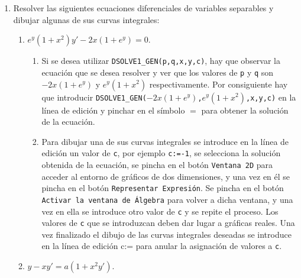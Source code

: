 \begin{enumerate}[leftmargin=*]
\item Resolver las siguientes ecuaciones diferenciales de variables separables y dibujar algunas de sus curvas integrales:
\begin{enumerate}
\item $e^{y}(1+x^{2})y'-2x(1+e^{y})=0$.

\begin{indicacion}
{
\begin{enumerate}
\item Si se desea utilizar \texttt{DSOLVE1\_GEN(p,q,x,y,c)}, hay que
 observar la ecuación que se desea resolver y ver que los valores de \texttt{p}
 y \texttt{q} son $-2x(1+e^{y})$ y $e^{y}(1+x^{2})$ respectivamente.
 Por consiguiente hay que introducir
 \texttt{DSOLVE1\_GEN(\texttt{$-2x(1+e^{y})$},\texttt{$e^{y}(1+x^{2})$},x,y,c)} en la
 línea de edición y pinchar en el símbolo $=$ para obtener la solución de la ecuación.
 \item Para dibujar una de sus curvas integrales se introduce
 en la línea de edición un valor de \texttt{c}, por ejemplo
 \texttt{c:=-1}, se selecciona la solución obtenida de la ecuación,
 se pincha en el botón \texttt{Ventana 2D} para acceder al entorno de
 gráficos de dos dimensiones, y una vez en él se pincha en el botón
 \texttt{Representar Expresión}. Se pincha en el botón \texttt{Activar la
 ventana de Álgebra} para volver a dicha ventana, y una vez en ella
 se introduce otro valor de \texttt{c} y se repite el proceso. Los valores de
 \texttt{c} que se introduzcan deben dar lugar a gráficas reales. Una vez
 finalizado el dibujo de las curvas integrales deseadas se introduce
 en la línea de edición c:= para anular la asignación de valores a
 \texttt{c}.
\end{enumerate}
}
\end{indicacion}

\item $y-xy'=a(1+x^{2}y')$.

\end{enumerate}
\end{enumerate}
